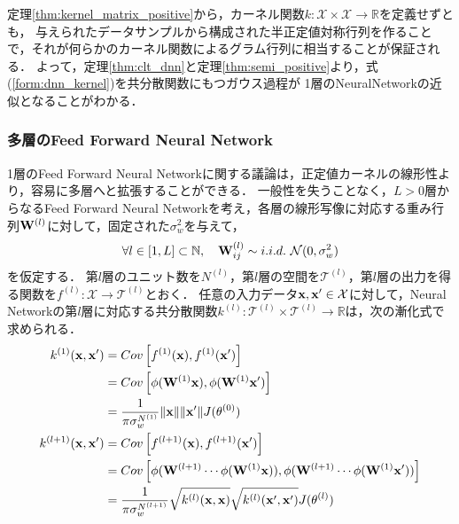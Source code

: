\documentclass[11pt,a4j]{article}
\begin{document}
        定理\ref{thm:kernel_matrix_positive}から，カーネル関数$k: \mathcal{X} \times \mathcal{X} \to \mathbb{R}$を定義せずとも，
        与えられたデータサンプルから構成された半正定値対称行列を作ることで，それが何らかのカーネル関数によるグラム行列に相当することが保証される．
        よって，定理\ref{thm:clt_dnn}と定理\ref{thm:semi_positive}より，式(\ref{form:dnn_kernel})を共分散関数にもつガウス過程が
        1層のNeuralNetworkの近似となることがわかる．

      \subsubsection{多層のFeed Forward Neural Network}
        1層のFeed Forward Neural Networkに関する議論は，正定値カーネルの線形性より，容易に多層へと拡張することができる．
        一般性を失うことなく，$L > 0$層からなるFeed Forward Neural Networkを考え，各層の線形写像に対応する重み行列${\bf W}^{(l)}$に対して，固定された$\sigma^2_w$を与えて，
        \begin{align}
          \forall l \in [1, L] \subset \mathbb{N}, ~~~ {\bf W}^{(l)}_{ij} \sim i.i.d. ~ \mathcal{N}(0, \sigma^2_w)
        \end{align}
        を仮定する．
        第$l$層のユニット数を$N^{(l)}$，第$l$層の空間を$\mathcal{T}^{(l)}$，第$l$層の出力を得る関数を$f^{(l)}: \mathcal{X} \to \mathcal{T}^{(l)}$とおく．
        任意の入力データ${\bf x}, {\bf x}' \in \mathcal{X}$に対して，Neural Networkの第$l$層に対応する共分散関数$k^{(l)}: \mathcal{T}^{(l)} \times \mathcal{T}^{(l)} \to \mathbb{R}$は，次の漸化式で求められる．
        \begin{align}
          k^{(1)}({\bf x}, {\bf x}') &= Cov \left[ f^{(1)}({\bf x}), f^{(1)}({\bf x}') \right] \nonumber \\
                                    &= Cov \left[ \phi({\bf W}^{(1)} {\bf x}), \phi({\bf W}^{(1)} {\bf x}') \right] \nonumber \\ 
                                    &= \frac{1}{\pi \sigma_w^{N^{(1)}}} \| {\bf x} \| \| {\bf x}' \| J(\theta^{(0)}) \\
          k^{(l+1)}({\bf x}, {\bf x}') &= Cov \left[ f^{(l+1)}({\bf x}), f^{(l+1)}({\bf x}') \right] \nonumber \\
                                      &= Cov \left[ \phi( {\bf W}^{(l+1)} \cdots \phi( {\bf W}^{(1)} {\bf x} )), \phi( {\bf W}^{(l+1)} \cdots \phi( {\bf W}^{(1)} {\bf x}' )) \right] \nonumber \\ 
                                      &= \frac{1}{ \pi \sigma_{w}^{ N^{(l+1)}}} \sqrt{ k^{(l)}({\bf x}, {\bf x}) } \sqrt{ k^{(l)}({\bf x}', {\bf x}') } J(\theta^{(l)})
        \end{align}
\end{document}
